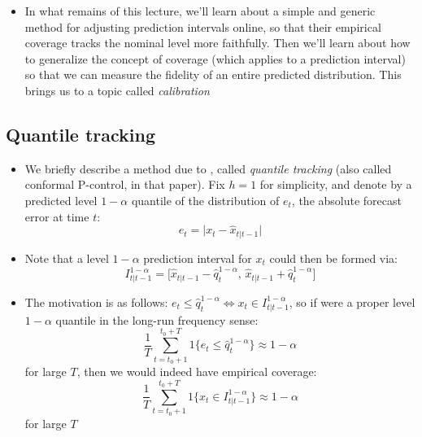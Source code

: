 \documentclass{article}
\begin{document}
\begin{itemize}
\item In what remains of this lecture, we'll learn about a simple and generic
  method for adjusting prediction intervals online, so that their empirical 
  coverage tracks the nominal level more faithfully. Then we'll learn about how
  to generalize the concept of coverage (which applies to a prediction interval)
  so that we can measure the fidelity of an entire predicted distribution. This 
  brings us to a topic called \emph{calibration} 
\end{itemize}

\subsection{Quantile tracking}

\begin{itemize}
\item We briefly describe a method due to \citet{angelopoulos2023conformal},
  called \emph{quantile tracking} (also called conformal P-control, in that
  paper). Fix $h=1$ for simplicity, and denote by 
  a predicted level $1-\alpha$ quantile of the distribution of $e_t$, the
  absolute forecast error at time $t$:   
  \[
  e_t = \big| x_t - \hat{x}_{t|t-1} \big|
  \]

\item Note that a level $1-\alpha$ prediction interval for $x_t$ could then be
  formed via: 
  \[
  I^{1-\alpha}_{t|t-1} = \big[ \hat{x}_{t|t-1} - \hat{q}^{1-\alpha}_t, \,
  \hat{x}_{t|t-1} + \hat{q}^{1-\alpha}_t \big]
  \]

\item The motivation is as follows: $e_t \leq \hat{q}^{1-\alpha}_t \iff x_t \in 
  I^{1-\alpha}_{t|t-1}$, so if  were a proper
  level $1-\alpha$ quantile in the long-run frequency sense:
  \[
  \frac{1}{T} \sum_{t=t_0+1}^{t_0+T} 1 \big\{ e_t \leq \hat{q}^{1-\alpha}_t
  \big\} \approx 1-\alpha
  \]
  for large $T$,  then we would indeed have empirical coverage: 
  \[
  \frac{1}{T} \sum_{t=t_0+1}^{t_0+T} 1 \big\{ x_t \in
    I^{1-\alpha}_{t|t-1} \big\} \approx 1-\alpha
  \]
  for large $T$


\end{itemize}
\end{document}
